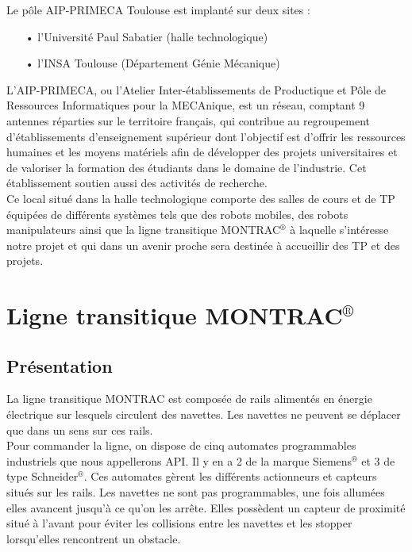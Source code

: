 \documentclass[a4paper,french, titlepage]{book}
\begin{document}
\vspace{0.8cm}

Le pôle AIP-PRIMECA Toulouse est implanté sur deux sites :
\begin{itemize}
\item[ ]
\item[•] l'Université Paul Sabatier (halle technologique)
\item[•] l'INSA Toulouse (Département Génie Mécanique)
\item[ ]
\end{itemize}

L'AIP-PRIMECA, ou l'Atelier Inter-établissements de Productique et Pôle de Ressources Informatiques pour la MECAnique, est un réseau, comptant 9 antennes réparties sur le territoire français, qui contribue au regroupement d'établissements d'enseignement supérieur dont l'objectif est d'offrir les ressources humaines et les moyens matériels afin de développer des projets universitaires et de valoriser la formation des étudiants dans le domaine de l'industrie. Cet établissement soutien aussi des activités de recherche.\\

Ce local situé dans la halle technologique comporte des salles de cours et de TP équipées de différents systèmes tels que des robots mobiles, des robots manipulateurs ainsi que la ligne transitique MONTRAC$^{\circledR}$ à laquelle s'intéresse notre projet et qui dans un avenir proche sera destinée à accueillir des TP et des projets.\\ 

\newpage
\section{Ligne transitique MONTRAC$^{\circledR}$}

\subsection{Présentation}

La ligne transitique MONTRAC est composée de rails alimentés en énergie électrique sur lesquels circulent des navettes. Les navettes ne peuvent se déplacer que dans un sens sur ces rails.\\
     
Pour commander la ligne, on dispose de cinq automates programmables industriels que nous appellerons API. Il y en a 2 de la marque Siemens$^{\circledR}$ et 3 de type Schneider$^{\circledR}$. Ces automates gèrent les différents actionneurs et capteurs situés sur les rails. Les navettes ne sont pas programmables, une fois allumées elles avancent jusqu'à ce qu'on les arrête. Elles possèdent un capteur de proximité situé à l'avant pour éviter les collisions entre les navettes et les stopper lorsqu'elles rencontrent un obstacle.\\       
\end{document}
